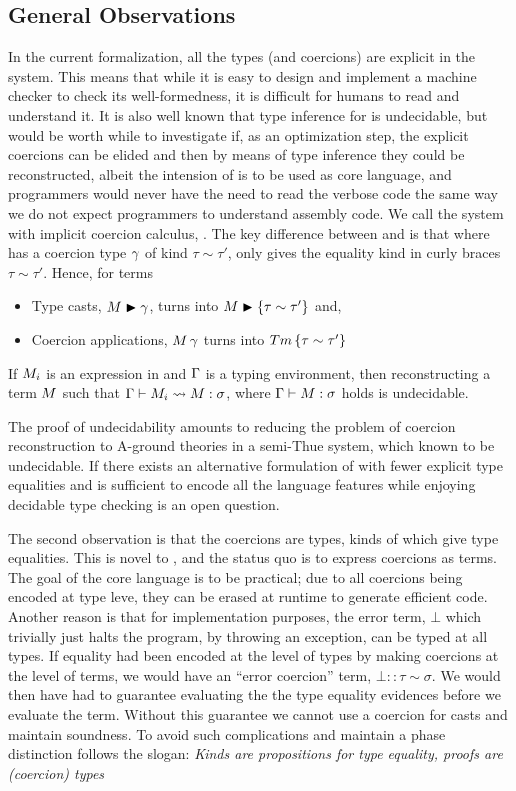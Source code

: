 \documentclass[screen,nonacm]{acmart}
\begin{document}
\subsection{General Observations}
In the current formalization, all the types (and coercions) are explicit in the system. This means that while it is easy to design and implement a machine checker to check its well-formedness, it is difficult for humans to read and understand it. It is also well known that type inference for \SF is undecidable\cite{wells_typability_1999}, but would be worth while to investigate if, as an optimization step, the explicit coercions can be elided and then by means of type inference they could be reconstructed, albeit the intension of \SFC is to be used as core language, and programmers would never have the need to read the verbose code the same way we do not expect programmers to understand assembly code. We call the system with implicit coercion calculus, \SFCi. The key difference between \SFC and \SFCi is that where \SFC has a coercion type $\gamma$ of kind $\tau\sim\tau'$, \SFCi only gives the equality kind in curly braces $\tau\sim\tau'$. Hence, for terms
\begin{itemize}
\item Type casts, $M\mathrel{\blacktriangleright}\gamma$, turns into $M\mathrel{\blacktriangleright}\{\tau \sim \tau'\}$ and,
\item Coercion applications, $M\,\gamma$ turns into $Tm\,\{\tau \sim \tau'\}$
\end{itemize}
\begin{theorem}
 If $M_i$ is an expression in \SFCi and $\Gamma$ is a typing environment, then reconstructing a \SFC term $M$ such that $\Gamma \vdash M_i \rightsquigarrow M : \sigma$, where $\Gamma \vdash M : \sigma$ holds is undecidable.
\end{theorem}
The proof of undecidability amounts to reducing the problem of coercion reconstruction to A-ground theories in a semi-Thue system, which known to be undecidable\cite{post_recursive_1947}. If there exists an alternative formulation of \SFCi with fewer explicit type equalities and is sufficient to encode all the language features while enjoying decidable type checking is an open question.

The second observation is that the coercions are types, kinds of which give type equalities. This is novel to \SFC, and the status quo is to express coercions as terms. The goal of the core language is to be practical; due to all coercions being encoded at type leve, they can be erased at runtime to generate efficient code. Another reason is that for implementation purposes, the error term, $\bot$ which trivially just halts the program, by throwing an exception, can be typed at all types. If equality had been encoded at the level of types by making coercions at the level of terms, we would have an ``error coercion'' term, $\bot :: \tau \sim \sigma$. We would then have had to guarantee evaluating the the type equality evidences before we evaluate the term. Without this guarantee we cannot use a coercion for casts and maintain soundness. To avoid such complications and maintain a phase distinction \SFC follows the slogan: \emph{Kinds are propositions for type equality, proofs are (coercion) types}
\end{document}
